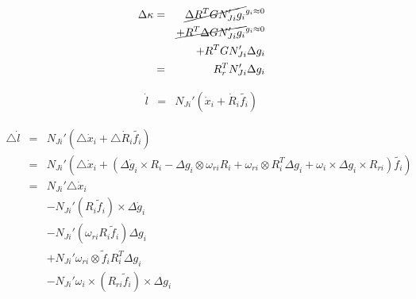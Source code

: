 \begin{eqnarray*}
\Delta\kappa & = & \cancel{\Delta R^{T}GN'_{Ji}g_{i}}^{g_{i}\approx0}\\
 &  & \cancel{+R^{T}\Delta GN'_{Ji}g_{i}}^{g_{i}\approx0}\\
 &  & +R^{T}GN'_{Ji}\Delta g_{i}\\
 & = & R_{r}^{T}N'_{Ji}\Delta g_{i}
\end{eqnarray*}

\begin{eqnarray*}
\dot{l} & = & N_{Ji}'(\dot{x}_{i}+\dot{R}_{i}\tilde{f_{i}})
\end{eqnarray*}

\begin{eqnarray*}
\triangle\dot{l} & = & N_{Ji}'(\triangle\dot{x}_{i}+\triangle\dot{R}_{i}\tilde{f_{i}})\\
 & = & N_{Ji}'(\triangle\dot{x}_{i}+\left(\Delta\dot{g}_{i}\times R_{i}-\Delta g_{i}\otimes\omega_{ri}R_{i}+\omega_{ri}\otimes R_{i}^{T}\Delta g_{i}+\omega_{i}\times\Delta g_{i}\times R_{ri}\right)\tilde{f_{i}})\\
 & = & N_{Ji}'\triangle\dot{x}_{i}\\
 &  & -N_{Ji}'(R_{i}\tilde{f}_{i})\times\Delta\dot{g}_{i}\\
 &  & -N_{Ji}'(\omega_{ri}R_{i}\tilde{f}_{i})\Delta g_{i}\\
 &  & +N_{Ji}'\omega_{ri}\otimes\tilde{f}_{i}R_{i}^{T}\Delta g_{i}\\
 &  & -N_{Ji}'\omega_{i}\times(R_{ri}\tilde{f}_{i})\times\Delta g_{i}
\end{eqnarray*}

